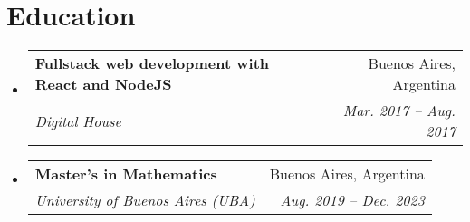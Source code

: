 \documentclass[letterpaper,11pt]{article}
\makeatletter
\newcommand{\resumeItem}[1]{
  \item\small{
    {#1 \vspace{-2pt}}
  }
}
\newcommand{\resumeSubheading}[4]{
  \vspace{-2pt}\item
    \begin{tabular*}{0.97\textwidth}[t]{l@{\extracolsep{\fill}}r}
      \textbf{#1} & #2 \\
      \textit{\small#3} & \textit{\small #4} \\
    \end{tabular*}\vspace{-7pt}
}
\newcommand{\resumeProjectHeading}[2]{
    \item
    \begin{tabular*}{0.97\textwidth}{l@{\extracolsep{\fill}}r}
      \small#1 & #2 \\
    \end{tabular*}\vspace{-7pt}
}
\newcommand{\resumeSubHeadingListStart}{\begin{itemize}[leftmargin=0.15in, label={}]}
\newcommand{\resumeSubHeadingListEnd}{\end{itemize}}
\newcommand{\resumeItemListStart}{\begin{itemize}}
\newcommand{\resumeItemListEnd}{\end{itemize}\vspace{-5pt}}
\makeatother
\begin{document}




%





%
\section{Education}
\resumeSubHeadingListStart
\resumeSubheading
{Fullstack web development with React and NodeJS}{Buenos Aires, Argentina}
{Digital House}{\normalfont Mar. 2017 -- Aug. 2017}
\resumeSubheading
{Master's in Mathematics}{Buenos Aires, Argentina}
{University of Buenos Aires (UBA)}{\normalfont Aug. 2019 -- Dec. 2023}
\resumeSubHeadingListEnd
\end{document}
